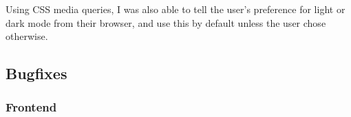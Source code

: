 Using CSS media queries, I was also able to tell the user's preference for light or dark mode from their browser, and use this by default unless the user chose otherwise. 

\subsection{Bugfixes}
\subsubsection{Frontend}


